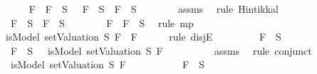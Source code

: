 \begin{isabellebody}
\ \ \ \ \isamarkupfalse%
\ {\isachardoublequoteopen}F{}\ \isactrlbold {\isasymrightarrow}\ F{}\ {\isasymin}\ S\ {\isasymlongrightarrow}\ \isactrlbold {\isasymnot}\ F{}\ {\isasymin}\ S\ {\isasymor}\ F{}\ {\isasymin}\ S{\isachardoublequoteclose}\isanewline
\ \ \ \ \ \ \isamarkupfalse%
\ assms{\isacharparenleft}{}{\isacharparenright}\ \isamarkupfalse%
\ {\isacharparenleft}rule\ Hintikka{\isacharunderscore}l{}{\isacharparenright}\isanewline
\ \ \ \ \isamarkupfalse%
\ \isamarkupfalse%
\ {\isachardoublequoteopen}\isactrlbold {\isasymnot}\ F{}\ {\isasymin}\ S\ {\isasymor}\ F{}\ {\isasymin}\ S{\isachardoublequoteclose}\isanewline
\ \ \ \ \ \ \isamarkupfalse%
\ {\isacartoucheopen}F{}\ \isactrlbold {\isasymrightarrow}\ F{}\ {\isasymin}\ S{\isacartoucheclose}\ \isamarkupfalse%
\ {\isacharparenleft}rule\ mp{\isacharparenright}\isanewline
\ \ \ \ \isamarkupfalse%
\ \isamarkupfalse%
\ {\isachardoublequoteopen}isModel\ {\isacharparenleft}setValuation\ S{\isacharparenright}\ {\isacharparenleft}F{}\ \isactrlbold {\isasymrightarrow}\ F{}{\isacharparenright}{\isachardoublequoteclose}\isanewline
\ \ \ \ \isamarkupfalse%
\ {\isacharparenleft}rule\ disjE{\isacharparenright}\isanewline
\ \ \ \ \ \ \isamarkupfalse%
\ {\isachardoublequoteopen}\isactrlbold {\isasymnot}\ F{}\ {\isasymin}\ S{\isachardoublequoteclose}\isanewline
\ \ \ \ \ \ \isamarkupfalse%
\ {\isachardoublequoteopen}\isactrlbold {\isasymnot}\ F{}\ {\isasymin}\ S\ {\isasymlongrightarrow}\ {\isasymnot}\ isModel\ {\isacharparenleft}setValuation\ S{\isacharparenright}\ F{}{\isachardoublequoteclose}\isanewline
\ \ \ \ \ \ \ \ \isamarkupfalse%
\ assms{\isacharparenleft}{}{\isacharparenright}\ \isamarkupfalse%
\ {\isacharparenleft}rule\ conjunct{}{\isacharparenright}\isanewline
\ \ \ \ \ \ \isamarkupfalse%
\ \isamarkupfalse%
\ {\isachardoublequoteopen}{\isasymnot}\ isModel\ {\isacharparenleft}setValuation\ S{\isacharparenright}\ F{}{\isachardoublequoteclose}\isanewline
\ \ \ \ \ \ \ \ \isamarkupfalse%
\ {\isacartoucheopen}\isactrlbold {\isasymnot}\ F{}\ {\isasymin}\ S{\isacartoucheclose}\ \isamarkupfalse%

\end{isabellebody}
